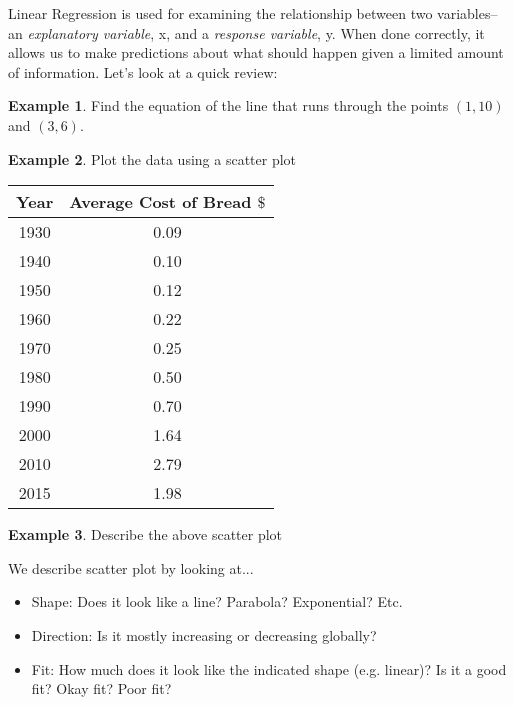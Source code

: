 \documentclass[12pt]{amsart}
\theoremstyle{definition}
\newtheorem{ex}{Example}
\begin{document}
Linear Regression is used for examining the relationship between two variables--an \emph{explanatory variable}, x, and a \emph{response variable}, y. When done correctly, it allows us to make predictions about what should happen given a limited amount of information. Let's look at a quick review:
\begin{ex} Find the equation of the line that runs through the points $(1,10)$ and $(3,6)$.\end{ex}
\vfill
\begin{ex} Plot the data using a scatter plot\\


\begin{tabular}{|c|c|}
	\hline
	Year & Average Cost of Bread $\$$\\
	\hline
	1930 & 0.09\\
	\hline
	1940 & 0.10 \\
	\hline
	1950 &  0.12 \\
	\hline
	1960 & 0.22 \\
	 \hline
	1970 & 0.25 \\
	  \hline
	1980 & 0.50 \\
	   \hline
	1990 & 0.70 \\
	    \hline
	2000 & 1.64 \\
	     \hline
	2010 & 2.79 \\
	 \hline
	2015 & 1.98 \\
	\hline
\end{tabular}
\vspace{0.25in} \end{ex}

\begin{ex} Describe the above scatter plot \end{ex}

\vfill
\newpage 

\begin{framed}
 \noindent We describe scatter plot by looking at...
\begin{itemize}
	\item Shape: Does it look like a line? Parabola? Exponential? Etc.
	\item Direction: Is it mostly increasing or decreasing globally?
	\item Fit: How much does it look like the indicated shape (e.g. linear)? Is it a good fit? Okay fit? Poor fit?
\end{itemize}
\end{framed}
\end{document}
